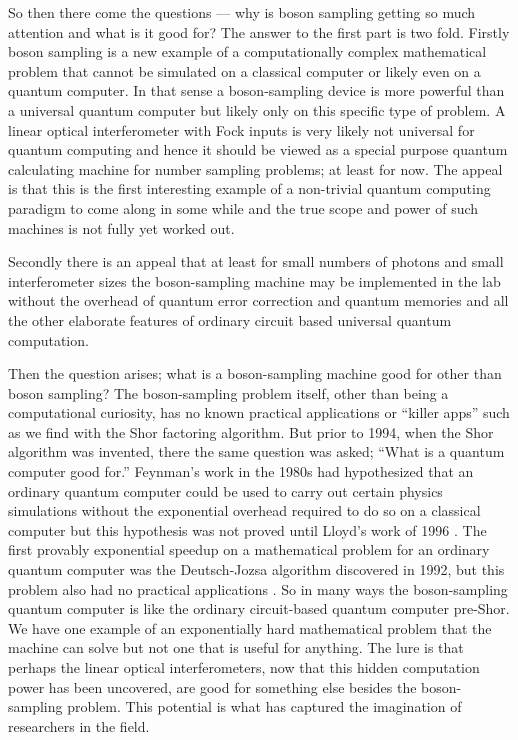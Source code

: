\documentclass[aps,pra,twocolumn,amsmath,amssymb,nofootinbib,superscriptaddress]{revtex4}
\begin{document}
	So then there come the questions — why is boson sampling getting so much attention and what is it good for? The answer to the first part is two fold. Firstly boson sampling is a new example of a computationally complex mathematical problem that cannot be simulated on a classical computer or likely even on a quantum computer. In that sense a boson-sampling device is more powerful than a universal quantum computer but likely only on this specific type of problem. A linear optical interferometer with Fock inputs is very likely not universal for quantum computing and hence it should be viewed as a special purpose quantum calculating machine for number sampling problems; at least for now. The appeal is that this is the first interesting example of a non-trivial quantum computing paradigm to come along in some while and the true scope and power of such machines is not fully yet worked out. 

	Secondly there is an appeal that at least for small numbers of photons and small interferometer sizes the boson-sampling machine may be implemented in the lab without the overhead of quantum error correction and quantum memories and all the other elaborate features of ordinary circuit based universal quantum computation. 

	Then the question arises; what is a boson-sampling machine good for other than boson sampling? The boson-sampling problem itself, other than being a computational curiosity, has no known practical applications or “killer apps” such as we find with the Shor factoring algorithm. But prior to 1994, when the Shor algorithm was invented, there the same question was asked; “What is a quantum computer good for.” Feynman’s work in the 1980s had hypothesized that an ordinary quantum computer could be used to carry out certain physics simulations without the exponential overhead required to do so on a classical computer but this hypothesis was not proved until Lloyd’s work of 1996 \cite{feyn,lloyd}. The first provably exponential speedup on a mathematical problem for an ordinary quantum computer was the Deutsch-Jozsa algorithm discovered in 1992, but this problem also had no practical applications \cite{deutsch}. So in many ways the boson-sampling quantum computer is like the ordinary circuit-based quantum computer pre-Shor. We have one example of an exponentially hard mathematical problem that the machine can solve but not one that is useful for anything. The lure is that perhaps the linear optical interferometers, now that this hidden computation power has been uncovered, are good for something else besides the boson-sampling problem. This potential is what has captured the imagination of researchers in the field. 
\end{document}
